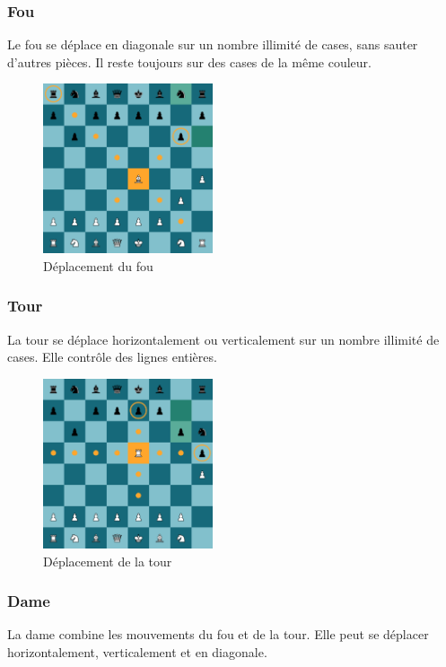 \documentclass{article}
\begin{document}
\subsubsection*{Fou}
Le fou se déplace en diagonale sur un nombre illimité de cases, sans sauter d'autres pièces. Il reste toujours sur des cases de la même couleur.

\begin{figure}[h]
    \centering
    \includegraphics[width=\textwidth,height=5.0cm,keepaspectratio]{fouMove.png}
    \caption{Déplacement du fou}
\end{figure}

\subsubsection*{Tour}
La tour se déplace horizontalement ou verticalement sur un nombre illimité de cases. Elle contrôle des lignes entières.

\begin{figure}[h]
    \centering
    \includegraphics[width=\textwidth,height=5.0cm,keepaspectratio]{tourMove.png}
    \caption{Déplacement de la tour}
\end{figure}

\subsubsection*{Dame}
La dame combine les mouvements du fou et de la tour. Elle peut se déplacer horizontalement, verticalement et en diagonale.
\end{document}
